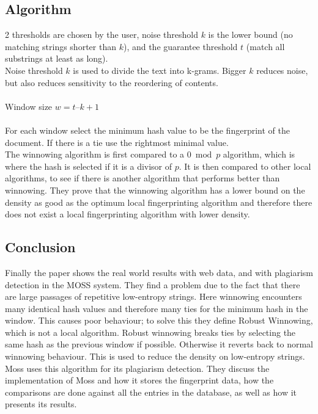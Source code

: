 \subsection{Algorithm}
2 thresholds are chosen by the user, noise threshold $k$ is the lower bound (no matching strings shorter than $k$), and the guarantee threshold $t$ (match all substrings at least as long).\\
Noise threshold $k$ is used to divide the text into k-grams. Bigger $k$ reduces noise, but also reduces sensitivity to the reordering of contents.\\\\
Window size $w = t – k +1$\\\\
For each window select the minimum hash value to be the fingerprint of the document. If there is a tie use the rightmost minimal value.\\
The winnowing algorithm is first compared to a $0 \bmod p$ algorithm, which is where the hash is selected if it is a divisor of $p$. It is then compared to other local algorithms, to see if there is another algorithm that performs better than winnowing. They prove that the winnowing algorithm has a lower bound on the density as good as the optimum local fingerprinting algorithm and therefore there does not exist a local fingerprinting algorithm with lower density.

\subsection{Conclusion}
Finally the paper shows the real world results with web data, and with plagiarism detection in the MOSS system. They find a problem due to the fact that there are large passages of repetitive low-entropy strings. Here winnowing encounters many identical hash values and therefore many ties for the minimum hash in the window. This causes poor behaviour; to solve this they define Robust Winnowing, which is not a local algorithm. Robust winnowing breaks ties by selecting the same hash as the previous window if possible. Otherwise it reverts back to normal winnowing behaviour. This is used to reduce the density on low-entropy strings. Moss uses this algorithm for its plagiarism detection. They discuss the implementation of Moss and how it stores the fingerprint data, how the comparisons are done against all the entries in the database, as well as how it presents its results.
\break
